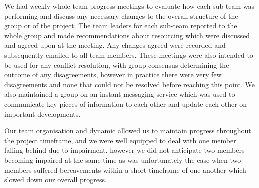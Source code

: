 We had weekly whole team progress meetings to evaluate how each sub-team was performing and discuss any necessary changes to the overall structure of the group or of the project. The team leaders for each sub-team reported to the whole group and made recommendations about resourcing which were discussed and agreed upon at the meeting. Any changes agreed were recorded and subsequently emailed to all team members. These meetings were also intended to be used for any conflict resolution, with group consensus determining the outcome of any disagreements, however in practice there were very few disagreements and none that could not be resolved before reaching this point. We also maintained a group on an instant messaging service which was used to communicate key pieces of information to each other and update each other on important developments.

Our team organisation and dynamic allowed us to maintain progress throughout the project timeframe, and we were well equipped to deal with one member falling behind due to impairment, however we did not anticipate two members becoming impaired at the same time as was unfortunately the case when two members suffered bereavements within a short timeframe of one another which slowed down our overall progress.